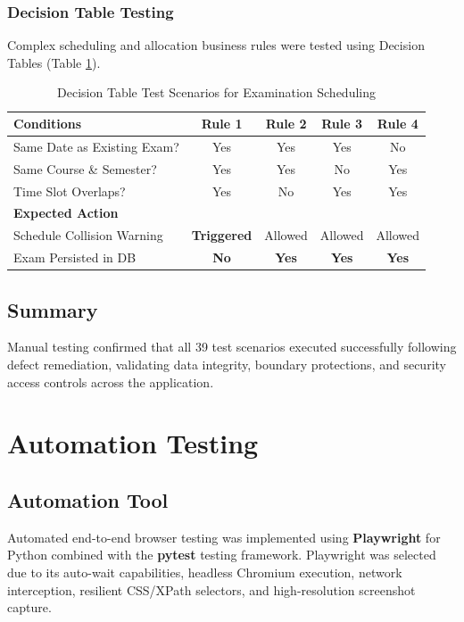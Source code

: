 \documentclass{InternshipReport}
\begin{document}
\subsection{Decision Table Testing}
Complex scheduling and allocation business rules were tested using Decision Tables (Table \ref{tab:decision_table}).

\begin{table}[H]
\centering
\small
\caption{Decision Table Test Scenarios for Examination Scheduling}
\label{tab:decision_table}
\begin{tabular}{l c c c c}
\toprule
\textbf{Conditions} & \textbf{Rule 1} & \textbf{Rule 2} & \textbf{Rule 3} & \textbf{Rule 4} \\
\midrule
Same Date as Existing Exam? & Yes & Yes & Yes & No \\
Same Course \& Semester? & Yes & Yes & No & Yes \\
Time Slot Overlaps? & Yes & No & Yes & Yes \\
\midrule
\textbf{Expected Action} & & & & \\
Schedule Collision Warning & \textbf{Triggered} & Allowed & Allowed & Allowed \\
Exam Persisted in DB & \textbf{No} & \textbf{Yes} & \textbf{Yes} & \textbf{Yes} \\
\bottomrule
\end{tabular}
\end{table}

\section{Summary}
Manual testing confirmed that all 39 test scenarios executed successfully following defect remediation, validating data integrity, boundary protections, and security access controls across the application.


\chapter{Automation Testing}

\section{Automation Tool}
Automated end-to-end browser testing was implemented using \textbf{Playwright} for Python combined with the \textbf{pytest} testing framework. Playwright was selected due to its auto-wait capabilities, headless Chromium execution, network interception, resilient CSS/XPath selectors, and high-resolution screenshot capture.
\end{document}
